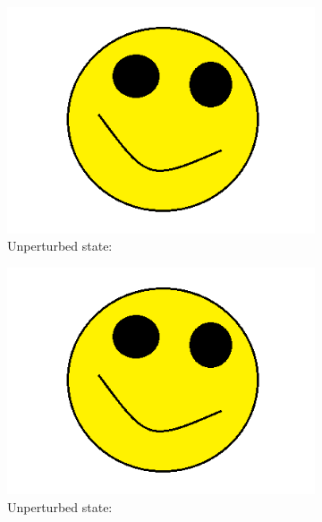 \documentclass[12pt]{report}
\begin{document}
\begin{figure}[H]
\begin{subfigure}{.5\textwidth}
\end{subfigure}%
\\
\begin{subfigure}{.5\textwidth}
  \centering
  \includegraphics[width=.98\linewidth]{figures/holder.png}
  \caption{Unperturbed state:}
  \label{fig:sfig2}
\end{subfigure}%
\begin{subfigure}{.5\textwidth}
  \centering
  \includegraphics[width=.98\linewidth]{figures/holder.png}
  \caption{Unperturbed state:}
  \label{fig:sfig5}
\end{subfigure}%
\\
\begin{subfigure}{.5\textwidth}
  \centering

\end{subfigure}
\end{figure}
\end{document}
